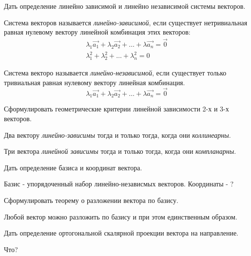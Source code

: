 \begin{question}
  Дать определение линейно зависимой и линейно независимой системы векторов.
\end{question}
\begin{answer}
  Система векторов называется \textit{линейно-зависимой}, если существует нетривиальная равная нулевому вектору линейной комбинация этих векторов:
  \begin{gather*}
    \lambda_1 \vec{a_1} + \lambda_2 \vec{a_2} + \ldots + \lambda \vec{a_n} = \vec{0} \\
    \lambda_1^2 + \lambda_2^2 + \ldots + \lambda_n^2 = 0
  \end{gather*}

  Система векторо называется \textit{линейно-независимой}, если существует только тривиальная равная нулевому вектору линейная комбинация.
  \[
    \lambda_1 \vec{a_1} + \lambda_2 \vec{a_2} + \ldots + \lambda \vec{a_n} = \vec{0}
  \] 
\end{answer}

\begin{question}
  Сформулировать геометрические критерии линейной зависимости 2-х и 3-х векторов.
\end{question}
\begin{answer}
  Два вектору \textit{линейно-зависимы} тогда и только тогда, когда они \textit{коллинеарны}.

  Три вектора \textit{линейной зависимы} тогда и только тогда, когда они \textit{компланарны}. 
\end{answer}

\begin{question}
  Дать определение базиса и координат вектора.
\end{question}
\begin{answer}
  Базис - упорядоченный набор линейно-независмых векторов. 
  Координаты - ? 
\end{answer}

\begin{question}
  Сформулировать теорему о разложении вектора по базису. 
\end{question}
\begin{answer}
  Любой вектор можно разложить по базису и при этом единственным образом.
\end{answer}

\begin{question}
  Дать определение ортогональной скалярной проекции вектора на направление.
\end{question}
\begin{answer}
  Что?
\end{answer}
 
